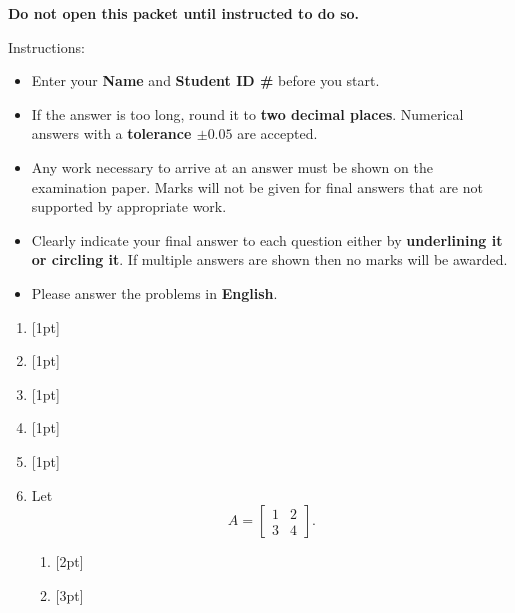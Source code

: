 \documentclass[a4paper]{article}
\newcommand{\CJKEN}[1]{\begin{CJK}{UTF8}{bkai}#1\end{CJK}}
\begin{document}
\begin{Large}
\begin{center}
\textbf{Do not open this packet until instructed to do so.}
\end{center}

\vfill
Instructions:
\begin{itemize}[label={\mybullet}]
\item Enter your \textbf{Name} and \textbf{Student ID \#} before you start.
\item If the answer is too long, round it to \textbf{two decimal places}.  Numerical answers with a \textbf{tolerance $\mathbf{\pm 0.05}$} are accepted.
\item Any work necessary to arrive at an answer must be shown on the examination paper.  Marks will not be given for final answers that are not supported by appropriate work.
\item Clearly indicate your final answer to each question either by \textbf{underlining it or circling it}.  If multiple answers are shown then no marks will be awarded.
\item Please answer the problems in \textbf{English}.
\end{itemize}

\newpage
{}
\begin{enumerate}

\item{} [1pt] 
\vspace{2cm}
\item{} [1pt] 
\vspace{2cm}
\item{} [1pt] 
\vspace{2cm}
\item{} [1pt] 
\vspace{2cm}
\item{} [1pt] 
\newpage


\item{} Let 
\[
    A = \begin{bmatrix}
      1 & 2 \\
      3 & 4 
    \end{bmatrix}.
\]
\begin{enumerate}
\item{} [2pt] 
\vspace{8cm}
\item{} [3pt] 
\end{enumerate}
\newpage



\end{enumerate}
\end{Large}
\end{document}
